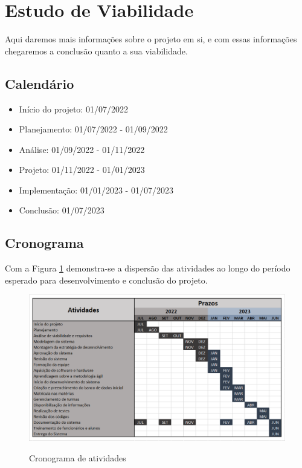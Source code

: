    \section{Estudo de Viabilidade}    %
        Aqui daremos mais informações sobre o projeto em si, e com essas informações chegaremos a conclusão quanto a sua viabilidade.
        
        \subsection{Calendário}    %
            \begin{itemize}
                \item Início do projeto: 01/07/2022
                \item Planejamento:      01/07/2022 - 01/09/2022
                \item Análise:           01/09/2022 - 01/11/2022
                \item Projeto:           01/11/2022 - 01/01/2023
                \item Implementação:     01/01/2023 - 01/07/2023
                \item Conclusão:         01/07/2023
            \end{itemize}
    
        \subsection{Cronograma}    %
            Com a Figura \ref{cronograma} demonstra-se a dispersão das atividades ao longo do período esperado para desenvolvimento e conclusão do projeto.
            \begin{figure}[htbp]\centering
                \caption{Cronograma de atividades}
                \includegraphics[angle=0,scale=0.68]{Pictures/JV/Cronograma.png}
                \label{cronograma}
            \end{figure}    %
    
